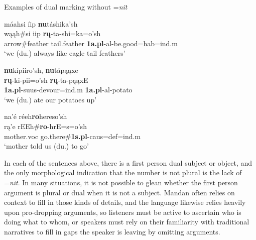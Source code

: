 \begin{exe}

\item\label{2ndpersondual} Examples of dual marking without =\textit{nit}

	\begin{xlist}
	
	\item\label{2ndpersondual1}
	\glll máahsi íip \textbf{nu}táshika'sh\\
	wąąh\#si iip \textbf{rų}-ta-shi=ka=o'sh\\
	\textnormal{arrow}\#\textnormal{feather} \textnormal{tail.feather} \textbf{1a.pl}-al-\textnormal{be.good}=hab=ind.m\\
	\glt `we (du.) always like eagle tail feathers' \citep[215]{hollow1973a}

	\item\label{2ndpersondual2}
	\glll \textbf{nu}kípiiro'sh, \textbf{nu}tápąąxe\\
	\textbf{rų}-ki-pii=o'sh \textbf{rų}-ta-pąąxE\\
	\textbf{1a.pl}-suus-\textnormal{devour}=ind.m \textbf{1a.pl}-al-\textnormal{potato}\\
	\glt `we (du.) ate our potatoes up' \citep[55]{hollow1973a}

	\item\label{2ndpersondual3}
	\glll na'é réeh\textbf{ro}hereso'sh\\
	rą'e rEEh\#\textbf{ro}-hrE=s=o'sh\\
	\textnormal{mother}.voc \textnormal{go.there}\#\textbf{1s.pl}-caus=def=ind.m\\
	\glt `mother told us (du.) to go' \citep[166]{hollow1973a}
	
	\end{xlist}

\end{exe}

In each of the sentences above, there is a first person dual subject or object, and the only morphological indication that the number is not plural is the lack of =\textit{nit}. In many situations, it is not possible to glean whether the first person argument is plural or dual when it is not a subject. Mandan often relies on context to fill in those kinds of details, and the language likewise relies heavily upon {pro}-dropping arguments, so listeners must be active to ascertain who is doing what to whom, or speakers must rely on their familiarity with traditional narratives to fill in gaps the speaker is leaving by omitting arguments.

